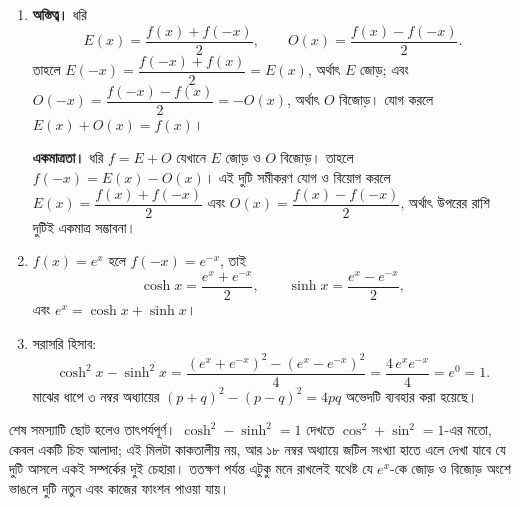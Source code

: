 \documentclass[11pt]{article}
\begin{document}
\begin{sol}
\begin{enumerate}
  \item \textbf{অস্তিত্ব।} ধরি
        \[
          E(x) = \frac{f(x) + f(-x)}{2}, \qquad
          O(x) = \frac{f(x) - f(-x)}{2} .
        \]
        তাহলে $E(-x) = \dfrac{f(-x)+f(x)}{2} = E(x)$, অর্থাৎ $E$ জোড়; এবং
        $O(-x) = \dfrac{f(-x)-f(x)}{2} = -O(x)$, অর্থাৎ $O$ বিজোড়। যোগ করলে
        $E(x) + O(x) = f(x)$।

        \textbf{একমাত্রতা।} ধরি $f = E + O$ যেখানে $E$ জোড় ও $O$ বিজোড়। তাহলে
        $f(-x) = E(x) - O(x)$। এই দুটি সমীকরণ যোগ ও বিয়োগ করলে
        $E(x) = \dfrac{f(x)+f(-x)}{2}$ এবং $O(x) = \dfrac{f(x)-f(-x)}{2}$,
        অর্থাৎ উপরের রাশি দুটিই একমাত্র সম্ভাবনা।
  \item $f(x) = e^{x}$ হলে $f(-x) = e^{-x}$, তাই
        \[
          \cosh x = \frac{e^{x} + e^{-x}}{2}, \qquad
          \sinh x = \frac{e^{x} - e^{-x}}{2},
        \]
        এবং $e^{x} = \cosh x + \sinh x$।
  \item সরাসরি হিসাব:
        \[
          \cosh^{2} x - \sinh^{2} x
          = \frac{\left( e^{x}+e^{-x} \right)^{2} - \left( e^{x}-e^{-x} \right)^{2}}{4}
          = \frac{4 \, e^{x} e^{-x}}{4} = e^{0} = 1 .
        \]
        মাঝের ধাপে ৩ নম্বর অধ্যায়ের $(p+q)^{2} - (p-q)^{2} = 4pq$ অভেদটি
        ব্যবহার করা হয়েছে।
\end{enumerate}
\end{sol}

\begin{remark}
শেষ সমস্যাটি ছোট হলেও তাৎপর্যপূর্ণ। $\cosh^{2} - \sinh^{2} = 1$ দেখতে
$\cos^{2} + \sin^{2} = 1$-এর মতো, কেবল একটি চিহ্ন আলাদা; এই মিলটা কাকতালীয় নয়,
আর ১৮ নম্বর অধ্যায়ে জটিল সংখ্যা হাতে এলে দেখা যাবে যে দুটি আসলে একই
সম্পর্কের দুই চেহারা। ততক্ষণ পর্যন্ত এটুকু মনে রাখলেই যথেষ্ট যে $e^{x}$-কে
জোড় ও বিজোড় অংশে ভাঙলে দুটি নতুন এবং কাজের ফাংশন পাওয়া যায়।
\end{remark}
\end{document}
